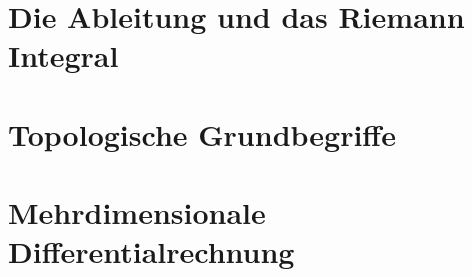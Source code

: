 \documentclass[a4paper,leqno]{article}
\begin{document}


\pagebreak

\section{Die Ableitung und das Riemann Integral}

\vspace{1\baselineskip}



\pagebreak



\vspace{2\baselineskip}



\pagebreak

\section{Topologische Grundbegriffe}

\vspace{1\baselineskip}



\vspace{2\baselineskip}



\vspace{2\baselineskip}



\vspace{2\baselineskip}



\vspace{2\baselineskip}



\pagebreak

\section{Mehrdimensionale Differentialrechnung}
\end{document}
